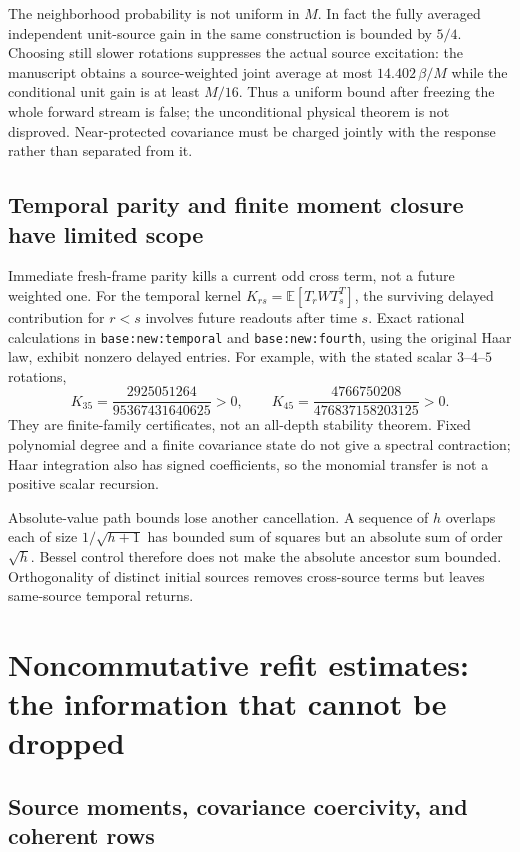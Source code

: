 \documentclass[11pt,oneside,openany,a4paper]{report}
\numberwithin{equation}{chapter}
\theoremstyle{definition}
\theoremstyle{remark}
\begin{document}
The neighborhood probability is not uniform in $M$.  In fact the
fully averaged independent unit-source gain in the same construction
is bounded by $5/4$.  Choosing still slower rotations suppresses the
actual source excitation: the manuscript obtains a source-weighted
joint average at most $14.402\,\beta/M$ while the conditional unit gain
is at least $M/16$.  Thus a uniform bound after freezing the whole
forward stream is false; the unconditional physical theorem is not
disproved.  Near-protected covariance must be charged jointly with
the response rather than separated from it.

\subsection{Temporal parity and finite moment closure have limited scope}

Immediate fresh-frame parity kills a current odd cross term, not a
future weighted one.  For the temporal kernel
$K_{rs}=\mathbb E[T_rWT_s^T]$, the surviving delayed contribution for
$r<s$ involves future readouts after time $s$.  Exact rational
calculations in \texttt{base:new:temporal} and
\texttt{base:new:fourth}, using the original Haar law, exhibit nonzero
delayed entries.  For example, with the stated scalar $3$--$4$--$5$
rotations,
\[
 K_{35}=\frac{2925051264}{95367431640625}>0,\qquad
 K_{45}=\frac{4766750208}{476837158203125}>0.
\]
They are finite-family certificates, not an all-depth stability
theorem.  Fixed polynomial degree and a finite covariance state do
not give a spectral contraction; Haar integration also has signed
coefficients, so the monomial transfer is not a positive scalar
recursion.

Absolute-value path bounds lose another cancellation.  A sequence of
$h$ overlaps each of size $1/\sqrt{h+1}$ has bounded sum of squares
but an absolute sum of order $\sqrt h$.  Bessel control therefore
does not make the absolute ancestor sum bounded.  Orthogonality of
distinct initial sources removes cross-source terms but leaves
same-source temporal returns.

\section{Noncommutative refit estimates: the information that cannot be dropped}
\label{origobs:noncommutative}

\subsection{Source moments, covariance coercivity, and coherent rows}
\end{document}
